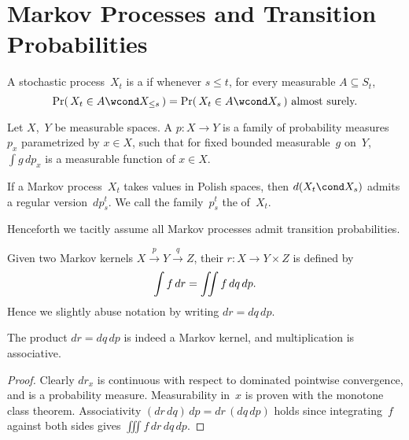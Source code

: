 \section	{Markov Processes and Transition Probabilities}

\begin	{definition}
A stochastic process~$X_t$ is a 
if whenever \( s \le t \), for every measurable \( A \subseteq S_t \), \[
\text
	{\( \Pr(\,X_t \in A \wcond X_{\le s}\,)
		= \Pr(\,X_t \in A \wcond X_s\,) \)
	almost surely.}
\]
\end	{definition}

\begin	{definition}
Let $X$,~$Y$ be measurable spaces.
A  \( p \colon X \to Y \)
is a family of probability measures~$p_x$ parametrized by \( x \in X \),
such that for fixed bounded measurable~$g$ on~$Y$,
\( \int g\,dp_x \) is a measurable function of \( x \in X \).
\end	{definition}

\begin	{definition}
If a Markov process~$X_t$ takes values in Polish spaces,
then \( d(X_t\cond X_s) \) admits a regular version~$dp^t_s$.
We call the family~$p^t_s$ the  of~$X_t$.
\end	{definition}

\begin	{remark}
Henceforth we tacitly assume all Markov processes
admit transition probabilities.
\end	{remark}

\begin	{definition}
Given two Markov kernels \( X \stackrel p\to Y \stackrel q\to Z \),
their  \( r \colon X \to Y \times Z \)
is defined by \[
	\int f\,dr = \iint f\,dq\,dp \text.
\]
Hence we slightly abuse notation by writing \( dr = dq\,dp \).
\end	{definition}

\begin	{proposition}
The product \( dr = dq\,dp \) is indeed a Markov kernel,
and multiplication is associative.
\end	{proposition}
\begin	{proof}
Clearly \( dr_x \) is continuous
with respect to dominated pointwise convergence,
and is a probability measure.
Measurability in~$x$ is proven with the monotone class theorem.
Associativity \( (dr\,dq)\,dp = dr\,(dq\,dp) \) holds
since integrating~$f$ against both sides gives
\( \iiint f\,dr\,dq\,dp \).
\end	{proof}

